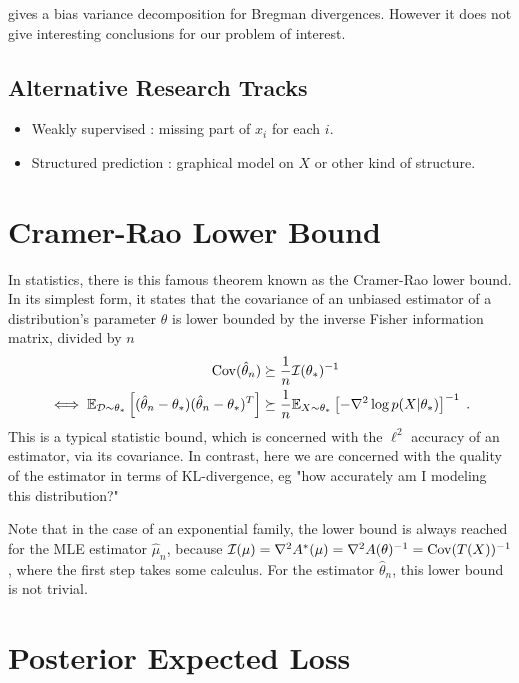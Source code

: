 \documentclass{article}
\newcommand*{\expect}[2][]{\ensuremath{\mathbb{E}_{#1} \left[ #2 \right] }} %
\newcommand{\logpart}{A}
\newcommand{\conj}{\logpart^*}
\newcommand{\natp}{\theta}
\begin{document}
\citet{pfau2013generalized} gives a bias variance decomposition for Bregman divergences. However it does not give interesting conclusions for our problem of interest.

\subsection{Alternative Research Tracks}
\begin{itemize}
	\item Weakly supervised : missing part of $x_i$ for each $i$.
	\item Structured prediction : graphical model on $X$ or other kind of structure.
\end{itemize}






\newpage
\appendix

\section{Cramer-Rao Lower Bound}
In statistics, there is this famous theorem known as the Cramer-Rao lower bound. In its simplest form, it states that the covariance of an unbiased estimator of a distribution's parameter $\natp$ is lower bounded by the inverse Fisher information matrix, divided by $n$
\begin{align}
    \Cov(\hat \natp_n)  
    &\succeq \inv{n} \cI(\natp_*)^{-1} \\
    \iff
    \expect[\cD\sim \natp_*]{(\hat \natp_n - \natp_*)(\hat \natp_n - \natp_*)^T}
    &\succeq \inv{n} \expect[X\sim \natp_*]{-\nabla^2 \log p(X|\natp_*)}^{-1} \; .
\end{align}
This is a typical statistic bound, which is concerned with the $\ell^2$ accuracy of an estimator, via its covariance. In contrast, here we are concerned with the quality of the estimator in terms of KL-divergence, eg "how accurately am I modeling this distribution?"

Note that in the case of an exponential family, the lower bound is always reached for the MLE estimator $\hat \mu_n$, because $\cI(\mu) = \nabla^2 \conj(\mu) = \nabla^2 \logpart(\natp)^{-1} = \Cov(T(X))^{-1}$, where the first step takes some calculus. For the estimator $\hat \natp_n$, this lower bound is not trivial.

\section{Posterior Expected Loss}
\end{document}
